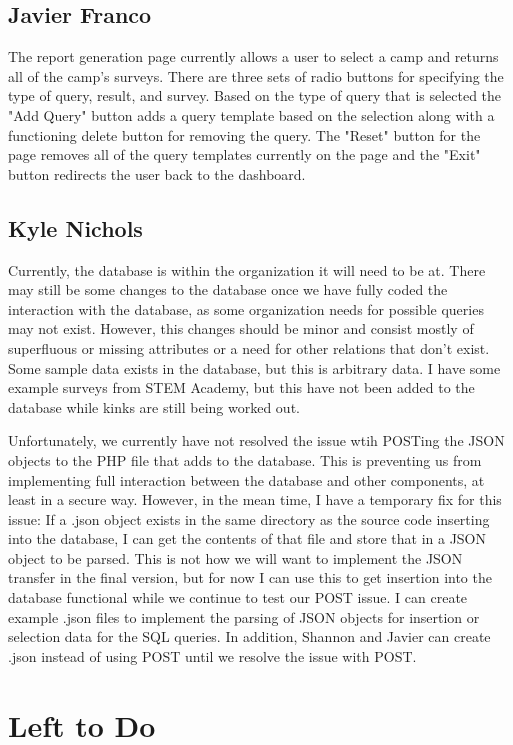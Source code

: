 \documentclass[letterpaper,10pt,serif, draftclsnofoot,onecolumn, compsoc, titlepage]{IEEEtran}
\begin{document}
\subsection{Javier Franco}
The report generation page currently allows a user to select a camp and returns all of the camp's surveys. There are three sets of radio buttons for specifying the type of query, result, and survey. Based on the type of query that is selected the "Add Query" button adds a query template based on the selection along with a functioning delete button for removing the query. The "Reset" button for the page removes all of the query templates currently on the page and the "Exit" button redirects the user back to the dashboard.

\subsection{Kyle Nichols}
Currently, the database is within the organization it will need to be at.
There may still be some changes to the database once we have fully coded the interaction with the database, as some organization needs for possible queries may not exist.
However, this changes should be minor and consist mostly of superfluous or missing attributes or a need for other relations that don't exist.
Some sample data exists in the database, but this is arbitrary data.
I have some example surveys from STEM Academy, but this have not been added to the database while kinks are still being worked out.

Unfortunately, we currently have not resolved the issue wtih POSTing the JSON objects to the PHP file that adds to the database.
This is preventing us from implementing full interaction between the database and other components, at least in a secure way.
However, in the mean time, I have a temporary fix for this issue:
If a .json object exists in the same directory as the source code inserting into the database, I can get the contents of that file and store that in a JSON object to be parsed.
This is not how we will want to implement the JSON transfer in the final version, but for now I can use this to get insertion into the database functional while we continue to test our POST issue.
I can create example .json files to implement the parsing of JSON objects for insertion or selection data for the SQL queries.
In addition, Shannon and Javier can create .json instead of using POST until we resolve the issue with POST.

\section{Left to Do}
\end{document}
